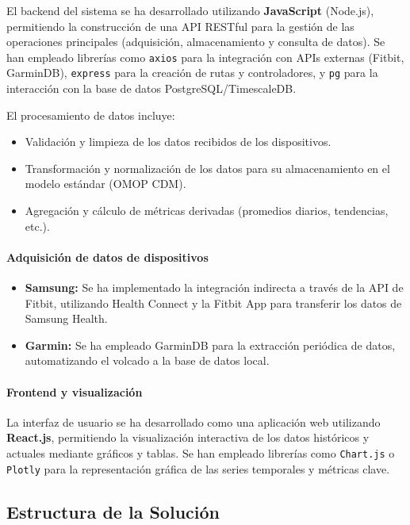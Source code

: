 El backend del sistema se ha desarrollado utilizando \textbf{JavaScript} (Node.js), permitiendo la construcción de una API RESTful para la gestión de las operaciones principales (adquisición, almacenamiento y consulta de datos). Se han empleado librerías como \texttt{axios} para la integración con APIs externas (Fitbit, GarminDB), \texttt{express} para la creación de rutas y controladores, y \texttt{pg} para la interacción con la base de datos PostgreSQL/TimescaleDB.

El procesamiento de datos incluye:
\begin{itemize}
    \item Validación y limpieza de los datos recibidos de los dispositivos.
    \item Transformación y normalización de los datos para su almacenamiento en el modelo estándar (OMOP CDM).
    \item Agregación y cálculo de métricas derivadas (promedios diarios, tendencias, etc.).
\end{itemize}

\paragraph{Adquisición de datos de dispositivos}

\begin{itemize}
    \item \textbf{Samsung:} Se ha implementado la integración indirecta a través de la API de Fitbit, utilizando Health Connect y la Fitbit App para transferir los datos de Samsung Health.
    \item \textbf{Garmin:} Se ha empleado GarminDB para la extracción periódica de datos, automatizando el volcado a la base de datos local.
\end{itemize}

\paragraph{Frontend y visualización}

La interfaz de usuario se ha desarrollado como una aplicación web utilizando \textbf{React.js}, permitiendo la visualización interactiva de los datos históricos y actuales mediante gráficos y tablas. Se han empleado librerías como \texttt{Chart.js} o \texttt{Plotly} para la representación gráfica de las series temporales y métricas clave.

\subsection{Estructura de la Solución}

